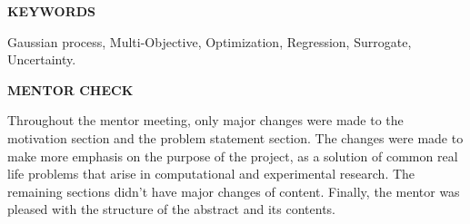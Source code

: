 \documentclass[a4paper]{article}
\begin{document}
{\large \textbf{KEYWORDS}\\}

{\normalsize Gaussian process, Multi-Objective, Optimization, Regression, Surrogate, Uncertainty.\\}

{\large \textbf{MENTOR CHECK}\\}

{\normalsize Throughout the mentor meeting, only major changes were made to the motivation section and the problem statement section. The changes were made to make more emphasis on the purpose of the project, as a solution of common real life problems that arise in computational and experimental research. The remaining sections didn't have major changes of content. Finally, the mentor was pleased with the structure of the abstract and its contents.}
\end{document}
